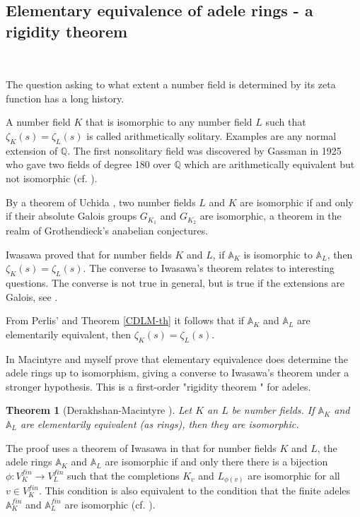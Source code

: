 \documentclass[12pt]{amsart}
\def\A{\mathbb{A}}
\def\Q{\mathbb{Q}}
\newtheorem{thm}{Theorem}[section]
\numberwithin{equation}{section}
\begin{document}
\medskip

\subsection{\bf Elementary equivalence of adele rings - a rigidity theorem}

\

\medskip

The question asking to what extent a number field is determined by its zeta function has a long history. 

A number field $K$ that is isomorphic to any number field $L$ such that $\zeta_K(s)=\zeta_L(s)$ is called arithmetically solitary. Examples are any normal extension of $\Q$. The first nonsolitary field was discovered by Gassman in 1925 who gave two fields of degree 180 over $\Q$ which are arithmetically equivalent but not isomorphic (cf. \cite{perlis}).

By a theorem of Uchida \cite{uchida}, two number fields $L$ and $K$ are isomorphic if and only if their absolute Galois groups $G_{K_1}$ and $G_{K_2}$ are isomorphic, a theorem in the realm of Grothendieck's anabelian conjectures.

Iwasawa \cite{iwasawa} proved that for number fields $K$ and $L$, if $\A_K$ is isomorphic to $\A_L$, then 
$\zeta_K(s)=\zeta_L(s)$. The converse to Iwasawa's theorem relates to interesting questions. The converse is not true in general, but is true if the extensions are Galois, see \cite{perlis}.

From Perlis' \cite[Theorem 1]{perlis} and Theorem \ref{CDLM-th} it follows that if $\A_K$ and $\A_L$ are elementarily equivalent, then $\zeta_K(s)=\zeta_L(s)$. 

In \cite{DM-ad2} Macintyre and myself prove that elementary equivalence does determine the adele rings
up to isomorphism, giving a converse to Iwasawa's theorem under a stronger hypothesis. This is a first-order "rigidity theorem " for adeles.
\begin{thm}[Derakhshan-Macintyre {\cite{DM-ad2}}]\label{isom} Let $K$ an $L$ be number fields. If $\A_K$ and $\A_L$ are elementarily equivalent (as rings), then they are isomorphic. 
\end{thm}

The proof uses a theorem of Iwasawa in \cite[pages 331-356]{iwasawa} that for number fields $K$ and $L$, the adele rings 
$\A_K$ and $\A_L$ are isomorphic if and only there there is a bijection 
$\phi: V_{K}^{fin} \rightarrow V_{L}^{fin}$ such that the completions $K_v$ and 
$L_{\phi(v)}$ are isomorphic for all $v\in V_{K}^{fin}$. This condition is also equivalent to the condition that the finite adeles $\A_K^{fin}$ and $\A_L^{fin}$ are isomorphic (cf. \cite{DM-ad2}).
\end{document}
